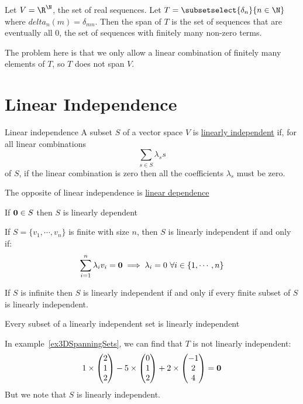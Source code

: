 \documentclass[../Main.tex]{subfiles}
\begin{document}
\begin{example}
    Let $V = \R^{\N}$, the set of real sequences. Let $T = \subsetselect{\delta_n}{n \in \N}$ where $delta_n(m) = \delta_{mn}$. Then the span of $T$ is the set of sequences that are eventually all $0$, the set of sequences with finitely many non-zero terms.

    The problem here is that we only allow a linear combination of finitely many elements of $T$, so $T$ does not span $V$.
\end{example}
\section{Linear Independence}
\begin{definition}{Linear independence}
    A subset $S$ of a vector space $V$ is \underline{linearly independent} if, for all linear combinations
    \begin{equation*}
        \sum_{s \in S} \lambda_s s
    \end{equation*}
    of $S$, if the linear combination is zero then all the coefficients $\lambda_s$ must be zero.
\end{definition}
\begin{remarks}
    \item The opposite of linear independence is \underline{linear dependence}
    \item If $\boldsymbol{0} \in S$ then $S$ is linearly dependent
    \item If $S = \{v_1, \cdots, v_n\}$ is finite with size $n$, then $S$ is linearly independent if and only if:
        \begin{equation*}
            \sum_{i = 1}^n \lambda_i v_i = \boldsymbol{0} \implies \lambda_i = 0~\forall i \in \{1, \cdots, n\}
        \end{equation*}
    \item If $S$ is infinite then $S$ is linearly independent if and only if every finite subset of $S$ is linearly independent.
    \item Every subset of a linearly independent set is linearly independent
\end{remarks}
\begin{example}
    In example~\ref{ex3DSpanningSets}, we can find that $T$ is not linearly independent:
    \begin{equation*}
        1 \times \begin{pmatrix} 2 \\ 1 \\ 2\end{pmatrix} - 5 \times \begin{pmatrix}0 \\ 1 \\ 2\end{pmatrix} + 2 \times \begin{pmatrix}-1 \\ 2 \\ 4\end{pmatrix} = \boldsymbol{0}
    \end{equation*}
    But we note that $S$ is linearly independent.
\end{example}
\end{document}
